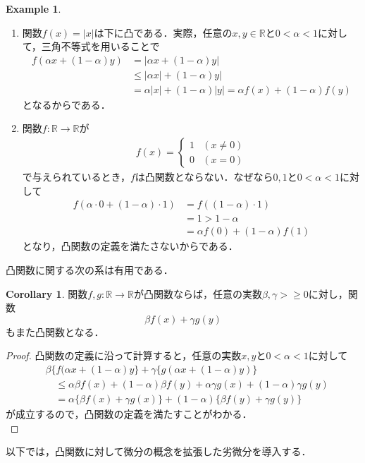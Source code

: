 \documentclass{jsarticle}
\theoremstyle{definition}
\theoremstyle{mystyle} %
\newtheorem*{ex}{Example}
\newtheorem*{col}{Corollary}
\begin{document}
\begin{ex}\mbox{}\\
\begin{enumerate}
\item 関数$f(x)=|x|$は下に凸である．実際，任意の$x,y\in\mathbb{R}$と$0<\alpha<1$に対して，三角不等式を用いることで
\begin{align*}
f(\alpha x+(1-\alpha)y)&=|\alpha x+(1-\alpha)y|\\
&\leq |\alpha x|+(1-\alpha)y|\\
&=\alpha |x|+(1-\alpha)|y|=\alpha f(x)+(1-\alpha)f(y)
\end{align*}
となるからである．\\

\item 関数$f:\mathbb{R}\to\mathbb{R}$が
\begin{align*}
f(x)=\begin{cases}
1&(x\neq 0)\\
0 & (x=0)
\end{cases}
\end{align*}
で与えられているとき，$f$は凸関数とならない．なぜなら$0,1$と$0<\alpha<1$に対して
\begin{align*}
f(\alpha\cdot 0+(1-\alpha)\cdot 1)&=f((1-\alpha)\cdot 1)\\
&=1>1-\alpha\\
&=\alpha f(0)+(1-\alpha)f(1)
\end{align*}
となり，凸関数の定義を満たさないからである．\\
\end{enumerate}
\end{ex}
凸関数に関する次の系は有用である．
\begin{col}
関数$f,g:\mathbb{R}\to\mathbb{R}$が凸関数ならば，任意の実数$\beta,\gamma>\geq 0$に対し，関数
$$\beta f(x)+\gamma g(y)$$
もまた凸関数となる．
\end{col}
\begin{proof}
凸関数の定義に沿って計算すると，任意の実数$x,y$と$0<\alpha<1$に対して
\begin{align*}
&\beta\{f(\alpha x+(1-\alpha)y\}+\gamma\{g(\alpha x+(1-\alpha)y)\}\\
&\quad \leq \alpha \beta f(x)+(1-\alpha)\beta f(y)+\alpha\gamma g(x)+(1-\alpha)\gamma g(y)\\
&\quad =\alpha\{\beta f(x)+\gamma g(x)\}+(1-\alpha)\{\beta f(y)+\gamma g(y)\}
\end{align*}
が成立するので，凸関数の定義を満たすことがわかる．\\
\end{proof}
以下では，凸関数に対して微分の概念を拡張した劣微分を導入する．
\end{document}
